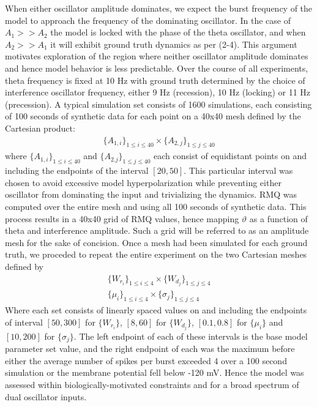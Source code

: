 \documentclass[12pt, letterpaper]{article}
\newenvironment{collapsable}{}{}
\begin{document}
\begin{collapsable}
  When either oscillator amplitude dominates, we expect
  the burst frequency of the model to approach the frequency of the dominating
  oscillator. In the case of $A_1>>A_2$ the model is locked with the phase of the theta
  oscillator, and when $A_2>>A_1$ it will exhibit ground truth dynamics as per
  (2-4). This argument motivates exploration of the region where neither
  oscillator amplitude dominates and hence model behavior is less predictable.
  Over the course of all experiments, theta frequency is fixed at 10 Hz with
  ground truth determined by the choice of interference oscillator frequency,
  either 9 Hz (recession), 10 Hz (locking) or 11 Hz (precession). A typical
  simulation set consists of 1600 simulations, each consisting of 100 seconds of synthetic
  data for each point on a 40x40 mesh defined by the Cartesian product:
  \begin{align*}
    \{A_{1,i}\}_{1\leq i\leq40}\times\{A_{2,j}\}_{1\leq j\leq 40}\tag{11}
  \end{align*}
  where $\{A_{1,i}\}_{1\leq i\leq 40}$ and $\{A_{2.j}\}_{1\leq j\leq 40}$ each
  consist of equidistant points on and including the endpoints of the interval
  $[20,50]$. This particular interval was chosen to avoid excessive model
  hyperpolarization while preventing either oscillator from dominating
  the input and trivializing the dynamics. RMQ was computed over the entire
  mesh and using all 100 seconds of synthetic data. This process results in a
  40x40 grid of RMQ values, hence mapping $\vartheta$ as a function of theta and
  interference amplitude. Such a grid will be referred to as an amplitude mesh
  for the sake of concision. Once a mesh had been simulated for each ground truth, we
  proceded to repeat the entire experiment on the two Cartesian
  meshes defined by
  \begin{align*}
    \{W_{r_i}\}_{1\leq i\leq 4}\times \{W_{d_j}\}_{1\leq j\leq 4}\tag{12}\\
    \{\mu_i\}_{1\leq i\leq 4}\times \{\sigma_j\}_{1\leq j\leq 4}\tag{13}
  \end{align*}
  Where each set consists of linearly spaced values on and including the endpoints
  of interval $[50, 300]$ for $\{W_{r_i}\}$, $[8,60]$ for $\{W_{d_j}\}$, $[0.1,
  0.8]$ for $\{\mu_i\}$ and $[10, 200]$ for $\{\sigma_j\}$. The left endpoint of
  each of these intervals is the base model parameter set value, and the right
  endpoint of each was the maximum before either the average number
  of spikes per burst exceeded 4 over a 100 second simulation or the membrane potential fell
  below -120 mV. Hence the model was assessed within biologically-motivated
  constraints and for a broad spectrum of dual oscillator inputs.
\end{collapsable}
\end{document}
